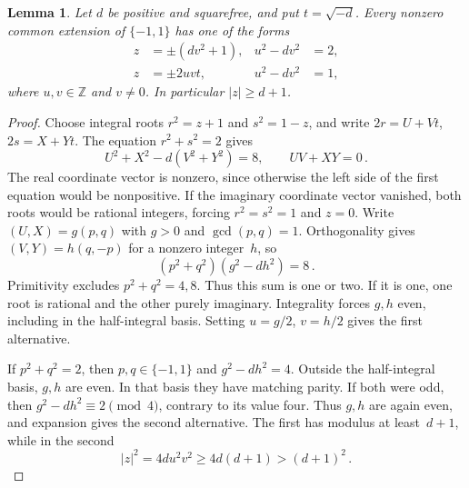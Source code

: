 \documentclass[12pt]{article}
\newtheorem{lemma}[theorem]{Lemma}
\numberwithin{equation}{section}
\begin{document}
\begin{samepage}
\begin{lemma}\label{sm:bs7-unit-axes}
Let $d$ be positive and squarefree, and put $t=\sqrt{-d}$. Every nonzero common extension of $\{-1,1\}$ has one of the forms
\begin{align*}
 z&=\pm(dv^2+1),& u^2-dv^2&=2,\\
 z&=\pm2uvt,& u^2-dv^2&=1,
\end{align*}
where $u,v\in\mathbb Z$ and $v\ne0$. In particular $|z|\ge d+1$.
\end{lemma}
\end{samepage}
\begin{proof}
Choose integral roots $r^2=z+1$ and $s^2=1-z$, and write $2r=U+Vt$, $2s=X+Yt$. The equation $r^2+s^2=2$ gives
\begin{equation*}
 U^2+X^2-d(V^2+Y^2)=8,\qquad UV+XY=0\,.
\end{equation*}
The real coordinate vector is nonzero, since otherwise the left side of the first equation would be nonpositive. If the imaginary coordinate vector vanished, both roots would be rational integers, forcing $r^2=s^2=1$ and $z=0$. Write $(U,X)=g(p,q)$ with $g>0$ and $\gcd(p,q)=1$. Orthogonality gives $(V,Y)=h(q,-p)$ for a nonzero integer~$h$, so
\begin{equation*}
 (p^2+q^2)(g^2-dh^2)=8\,.
\end{equation*}
Primitivity excludes $p^2+q^2=4,8$. Thus this sum is one or two. If it is one, one root is rational and the other purely imaginary. Integrality forces $g,h$ even, including in the half-integral basis. Setting $u=g/2$, $v=h/2$ gives the first alternative.

If $p^2+q^2=2$, then $p,q\in\{-1,1\}$ and $g^2-dh^2=4$. Outside the half-integral basis, $g,h$ are even. In that basis they have matching parity. If both were odd, then $g^2-dh^2\equiv2\pmod4$, contrary to its value four. Thus $g,h$ are again even, and expansion gives the second alternative. The first has modulus at least~$d+1$, while in the second
\begin{equation*}
 |z|^2=4du^2v^2\ge4d(d+1)>(d+1)^2\,.
\end{equation*}
\end{proof}
\end{document}
